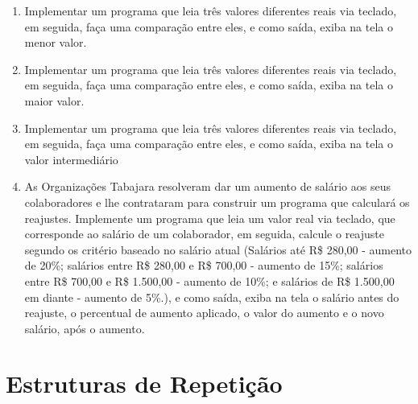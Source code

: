 \documentclass[11pt]{article}
\begin{document}
\begin{enumerate}
	\item Implementar um programa que leia três valores diferentes reais via teclado, em seguida, faça uma
	comparação entre eles, e como saída, exiba na tela o menor valor.
	
	\item  Implementar um programa que leia três valores diferentes reais via teclado, em seguida, faça uma
	comparação entre eles, e como saída, exiba na tela o maior valor.
	
	\item Implementar um programa que leia três valores diferentes reais via teclado, em seguida, faça uma
	comparação entre eles, e como saída, exiba na tela o valor intermediário
	
	\item As Organizações Tabajara resolveram dar um aumento de salário aos seus colaboradores e lhe
	contrataram para construir um programa que calculará os reajustes. Implemente um programa
	que leia um valor real via teclado, que corresponde ao salário de um colaborador, em seguida,
	calcule o reajuste segundo os critério baseado no salário atual (Salários até R\$ 280,00 - aumento
	de 20\%; salários entre R\$ 280,00 e R\$ 700,00 - aumento de 15\%; salários entre R\$ 700,00 e R\$
	1.500,00 - aumento de 10\%; e salários de R\$ 1.500,00 em diante - aumento de 5\%.), e como saída,
	exiba na tela o salário antes do reajuste, o percentual de aumento aplicado, o valor do aumento
	e o novo salário, após o aumento.
\end{enumerate}

\newpage

\section{Estruturas de Repetição}
\end{document}
